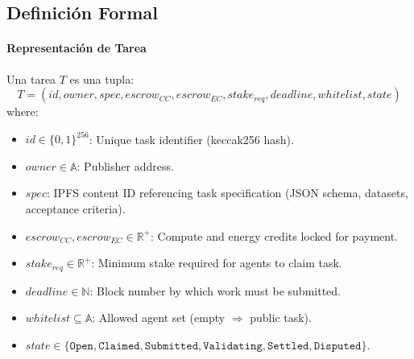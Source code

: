 \documentclass[11pt]{article}
\begin{document}
\subsection{Definición Formal}
\paragraph{Representación de Tarea} Una tarea $T$ es una tupla:
\begin{equation}
T = (id, owner, spec, escrow_{CC}, escrow_{EC}, stake_{req}, deadline, whitelist, state)
\end{equation}
where:
\begin{itemize}[noitemsep]
  \item $id \in \{0,1\}^{256}$: Unique task identifier (keccak256 hash).
  \item $owner \in \mathbb{A}$: Publisher address.
  \item $spec$: IPFS content ID referencing task specification (JSON schema, datasets, acceptance criteria).
  \item $escrow_{CC}, escrow_{EC} \in \mathbb{R}^+$: Compute and energy credits locked for payment.
  \item $stake_{req} \in \mathbb{R}^+$: Minimum stake required for agents to claim task.
  \item $deadline \in \mathbb{N}$: Block number by which work must be submitted.
  \item $whitelist \subseteq \mathbb{A}$: Allowed agent set (empty $\Rightarrow$ public task).
  \item $state \in \{\texttt{Open}, \texttt{Claimed}, \texttt{Submitted}, \texttt{Validating}, \texttt{Settled}, \texttt{Disputed}\}$.
\end{itemize}
\end{document}
